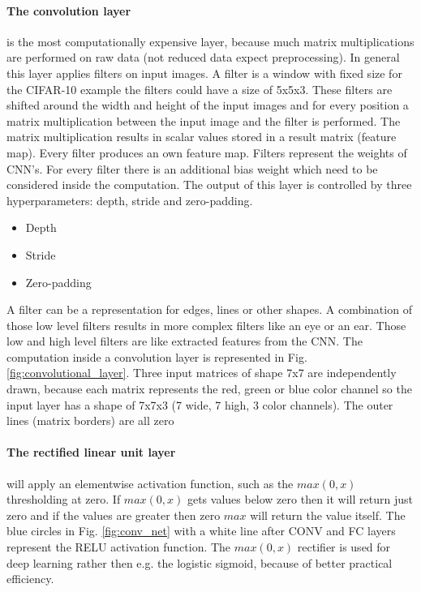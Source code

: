 \documentclass[conference]{IEEEtran}
\begin{document}
\paragraph{The convolution layer} is the most computationally expensive layer, because much matrix multiplications are performed on raw data (not reduced data expect preprocessing). In general this layer applies filters on input images. A filter is a window with fixed size for the CIFAR-10 example the filters could have a size of 5x5x3. These filters are shifted around the width and height of the input images and for every position a matrix multiplication between the input image and the filter is performed. The matrix multiplication results in scalar values stored in a result matrix (feature map). Every filter produces an own feature map. Filters represent the weights of CNN's. For every filter there is an additional bias weight which need to be considered inside the computation. The output of this layer is controlled by three hyperparameters: depth, stride and zero-padding.

\begin{itemize}
\item Depth
\item Stride
\item Zero-padding
\end{itemize}    

A filter can be a representation for edges, lines or other shapes. A combination of those low level filters results in more complex filters like an eye or an ear. Those low and high level filters are like extracted features from the CNN. The computation inside a convolution layer is represented in Fig. \ref{fig:convolutional_layer}. Three input matrices of shape 7x7 are independently drawn, because each matrix represents the red, green or blue color channel so the input layer has a shape of 7x7x3 (7 wide, 7 high, 3 color channels). The outer lines (matrix borders) are all zero 

\paragraph{The rectified linear unit layer} will apply an elementwise activation function, such as the $max(0,x)$ thresholding at zero. If $max(0,x)$ gets values below zero then it will return just zero and if the values are greater then zero $max$ will return the value itself. The blue circles in Fig. \ref{fig:conv_net} with a white line after CONV and FC layers represent the RELU activation function. The $max(0,x)$ rectifier is used for deep learning rather then e.g. the logistic sigmoid, because of better practical efficiency.
\end{document}

